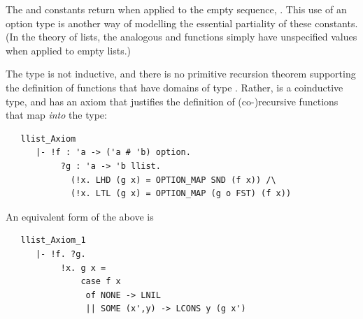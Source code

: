 The  and  constants return  when applied to
the empty sequence, .  This use of an option type is another
way of modelling the essential partiality of these constants.  (In the
theory of lists, the analogous  and  functions simply
have unspecified values when applied to empty lists.)

The type  is not inductive, and there is no primitive
recursion theorem supporting the definition of functions that have
domains of type .  Rather,  is a coinductive type,
and has an axiom that justifies the definition of (co-)recursive
functions that map \emph{into} the  type:
\begin{hol}
\begin{verbatim}
   llist_Axiom
      |- !f : 'a -> ('a # 'b) option.
           ?g : 'a -> 'b llist.
             (!x. LHD (g x) = OPTION_MAP SND (f x)) /\
             (!x. LTL (g x) = OPTION_MAP (g o FST) (f x))
\end{verbatim}
\end{hol}
\noindent An equivalent form of the above is
\begin{hol}
\begin{verbatim}
   llist_Axiom_1
      |- !f. ?g.
           !x. g x =
               case f x
                of NONE -> LNIL
                || SOME (x',y) -> LCONS y (g x')
\end{verbatim}
\end{hol}

